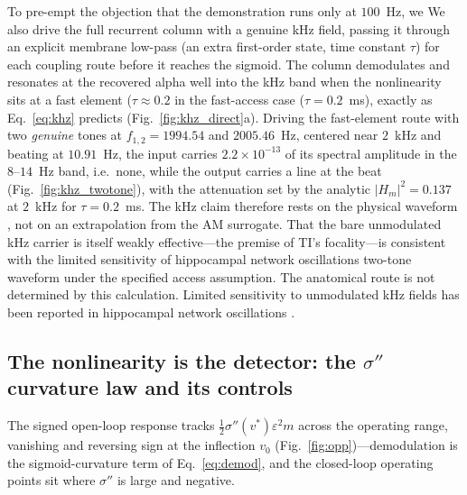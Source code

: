 \documentclass[11pt,a4paper]{article}
\newcommand{\Sig}{\sigma}
\newcommand{\half}{\tfrac{1}{2}}
\providecommand{\DIFaddtex}[1]{{\protect\color{blue} \sf #1}} %
\providecommand{\DIFdeltex}[1]{{\protect\color{red} \scriptsize #1}} %
\providecommand{\DIFaddbegin}{} %
\providecommand{\DIFaddend}{} %
\providecommand{\DIFdelbegin}{} %
\providecommand{\DIFdelend}{} %
\providecommand{\DIFadd}[1]{\texorpdfstring{\DIFaddtex{#1}}{#1}} %
\providecommand{\DIFdel}[1]{\texorpdfstring{\DIFdeltex{#1}}{}} %
\begin{document}
\DIFdelbegin \DIFdel{To pre-empt the objection that the demonstration runs only at $100$~Hz, we }\DIFdelend \DIFaddbegin \DIFadd{We also }\DIFaddend drive the full recurrent column with a \DIFdelbegin \DIFdel{genuine }\DIFdelend kHz field, passing it through
an explicit membrane low-pass (an extra first-order state, time constant $\tau$) for
each coupling route before it reaches the sigmoid. The
column demodulates and resonates at the recovered alpha \DIFdelbegin \DIFdel{well into the kHz band when
the nonlinearity sits at a fast element ($\tau\!\approx\!0.2$}\DIFdelend \DIFaddbegin \DIFadd{in the fast-access case
($\tau=0.2$}\DIFaddend ~ms), \DIFdelbegin \DIFdel{exactly }\DIFdelend as
Eq.~\eqref{eq:khz} predicts (Fig.~\ref{fig:khz_direct}a). Driving the fast-element route
with two \emph{genuine} tones at $f_{1,2}=1994.54$ and $2005.46$~Hz, centered near
$2$~kHz and beating at $10.91$~Hz, the input carries $2.2\times10^{-13}$ of its spectral
amplitude in the $8$--$14$~Hz band, i.e.\ none, while the output carries a line at the
beat
(Fig.~\ref{fig:khz_twotone}), with the attenuation set by the analytic
$|H_m|^2\!=\!0.137$ at $2$~kHz for $\tau=0.2$~ms. The kHz claim therefore rests on the
\DIFdelbegin \DIFdel{physical waveform , not on an extrapolation from the AM surrogate. That the bare unmodulated kHz carrier is
itself
weakly effective---the premise of TI's focality---is consistent with the limited
sensitivity of hippocampal network oscillations }\DIFdelend \DIFaddbegin \DIFadd{two-tone waveform under the specified access assumption. The anatomical route is
not determined by this calculation. Limited sensitivity }\DIFaddend to unmodulated kHz fields
\DIFaddbegin \DIFadd{has been reported in hippocampal network oscillations }\DIFaddend \cite{esmaeilpour2020}.

\subsection{The nonlinearity is the detector: the
\texorpdfstring{$\Sig''$}{sigma''} curvature law and its controls}\label{sec:results-curvature}
The signed open-loop response tracks $\half\Sig''(v^*)\varepsilon^2 m$ across the
operating range, vanishing and reversing sign at the inflection $v_0$
(Fig.~\ref{fig:opp})---demodulation is the sigmoid-curvature term of
Eq.~\eqref{eq:demod}, and the closed-loop operating points sit where $\Sig''$ is large
and negative.
\end{document}
